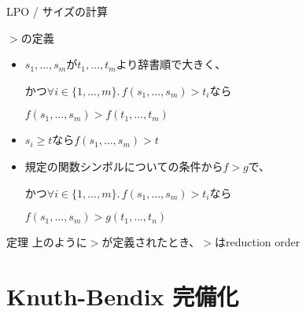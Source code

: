 \documentclass[dvipdfmx,11pt,notheorems]{beamer}
\theoremstyle{definition}
\begin{document}
\begin{frame}{LPO / サイズの計算}
  \begin{block}{$>$の定義}
    \begin{itemize}
      \item $s_1, \ldots, s_m$が$t_1, \ldots, t_m$より辞書順で大きく、

      かつ$\forall i \in \{1, \ldots, m\}.\, f(s_1, \ldots, s_m) > t_i$なら

      $f(s_1, \ldots, s_m) > f(t_1, \ldots, t_m)$

      \item $s_i \geq t$なら$f(s_1, \ldots, s_m) > t$

      \item 規定の関数シンボルについての条件から$f>g$で、

      かつ$\forall i \in \{1, \ldots, m\}.\, f(s_1, \ldots, s_m) > t_i$なら

      $f(s_1, \ldots, s_m) > g(t_1, \ldots, t_n)$
    \end{itemize}
  \end{block}
  \begin{block}{定理}
    上のように$>$が定義されたとき、$>$はreduction order
  \end{block}
\end{frame}

\section{Knuth-Bendix 完備化}
\end{document}
